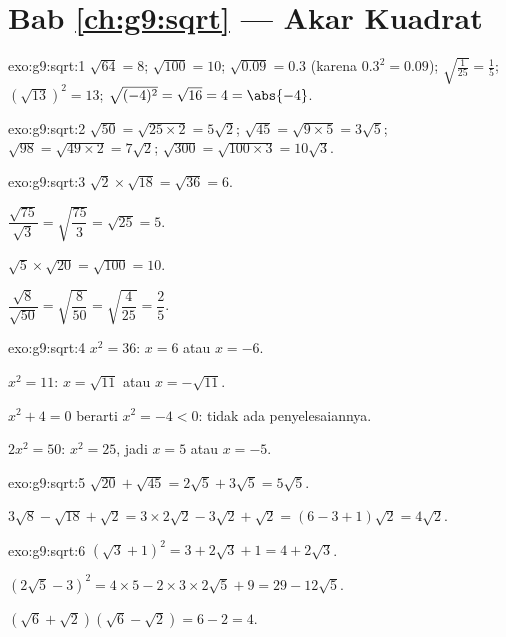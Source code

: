 \section*{Bab \ref{ch:g9:sqrt} --- Akar Kuadrat}

\begin{solution}{exo:g9:sqrt:1}
$\sqrt{64} = 8$; \quad $\sqrt{100} = 10$; \quad
$\sqrt{0.09} = 0.3$ (karena $0.3^2 = 0.09$); \quad
$\sqrt{\frac{1}{25}} = \frac15$; \quad
$\left(\sqrt{13}\right)^2 = 13$; \quad
$\sqrt{(-4)^2} = \sqrt{16} = 4 = \abs{-4}$.
\end{solution}

\begin{solution}{exo:g9:sqrt:2}
$\sqrt{50} = \sqrt{25 \times 2} = 5\sqrt2$; \quad
$\sqrt{45} = \sqrt{9 \times 5} = 3\sqrt5$; \quad
$\sqrt{98} = \sqrt{49 \times 2} = 7\sqrt2$; \quad
$\sqrt{300} = \sqrt{100 \times 3} = 10\sqrt3$.
\end{solution}

\begin{solution}{exo:g9:sqrt:3}
$\sqrt2 \times \sqrt{18} = \sqrt{36} = 6$.

$\dfrac{\sqrt{75}}{\sqrt3} = \sqrt{\dfrac{75}{3}} = \sqrt{25} = 5$.

$\sqrt5 \times \sqrt{20} = \sqrt{100} = 10$.

$\dfrac{\sqrt8}{\sqrt{50}} = \sqrt{\dfrac{8}{50}} = \sqrt{\dfrac{4}{25}}
= \dfrac25$.
\end{solution}

\begin{solution}{exo:g9:sqrt:4}
$x^2 = 36$: $x = 6$ atau $x = -6$.

$x^2 = 11$: $x = \sqrt{11}$ atau $x = -\sqrt{11}$.

$x^2 + 4 = 0$ berarti $x^2 = -4 < 0$: tidak ada penyelesaiannya.

$2x^2 = 50$: $x^2 = 25$, jadi $x = 5$ atau $x = -5$.
\end{solution}

\begin{solution}{exo:g9:sqrt:5}
$\sqrt{20} + \sqrt{45} = 2\sqrt5 + 3\sqrt5 = 5\sqrt5$.

$3\sqrt8 - \sqrt{18} + \sqrt2 = 3 \times 2\sqrt2 - 3\sqrt2 + \sqrt2
= (6 - 3 + 1)\sqrt2 = 4\sqrt2$.
\end{solution}

\begin{solution}{exo:g9:sqrt:6}
$\left(\sqrt3 + 1\right)^2 = 3 + 2\sqrt3 + 1 = 4 + 2\sqrt3$.

$\left(2\sqrt5 - 3\right)^2 = 4 \times 5 - 2 \times 3 \times 2\sqrt5 + 9
= 29 - 12\sqrt5$.

$\left(\sqrt6 + \sqrt2\right)\left(\sqrt6 - \sqrt2\right) = 6 - 2 = 4$.
\end{solution}

